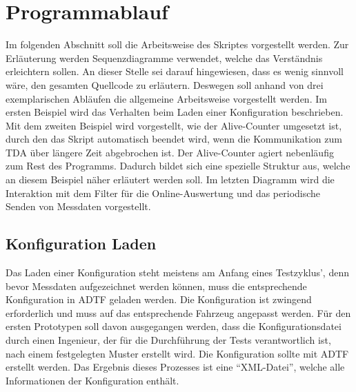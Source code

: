 \documentclass[12pt,a4paper]{report}
\begin{document}
\section{Programmablauf}\label{sec:Programmablauf}
Im folgenden Abschnitt soll die Arbeitsweise des Skriptes vorgestellt werden. Zur Er\-läu\-te\-rung werden Sequenzdiagramme verwendet, welche das Verständnis erleichtern sollen. An dieser Stelle sei darauf hingewiesen, dass es wenig sinnvoll wäre, den gesamten Quellcode zu erläutern. Deswegen soll anhand von drei exemplarischen Abläufen die allgemeine Arbeitsweise vorgestellt werden. Im ersten Beispiel wird das Verhalten beim Laden einer Konfiguration beschrieben. Mit dem zweiten Beispiel wird vorgestellt, wie der Alive-Counter umgesetzt ist, durch den das Skript automatisch beendet wird, wenn die Kommunikation zum TDA über längere Zeit abgebrochen ist. Der Alive-Counter agiert nebenläufig zum Rest des Programms. Dadurch bildet sich eine spezielle Struktur aus, welche an diesem Beispiel näher erläutert werden soll. Im letzten Diagramm wird die Interaktion mit dem Filter für die Online-Auswertung und das periodische Senden von Messdaten vorgestellt.
\subsection{Konfiguration Laden}\label{subsec:Konfiguration Laden}
Das Laden einer Konfiguration steht meistens am Anfang eines Testzyklus', denn bevor Messdaten aufgezeichnet werden können, muss die entsprechende Konfiguration in ADTF geladen werden. Die Konfiguration ist zwingend erforderlich und muss auf das entsprechende Fahrzeug angepasst werden. Für den ersten Prototypen soll davon ausgegangen werden, dass die Konfigurationsdatei durch einen Ingenieur, der für die Durchführung der Tests verantwortlich ist, nach einem festgelegten Muster erstellt wird. Die Konfiguration sollte mit ADTF erstellt werden. Das Ergebnis dieses Prozesses ist eine "`XML-Datei"', welche alle Informationen der Konfiguration enthält.
\end{document}
